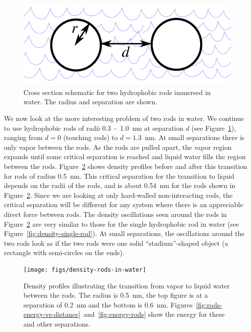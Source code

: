 \documentclass[letterpaper,twocolumn,amsmath,amssymb,prb]{revtex4-1}
\begin{document}
\begin{figure}
\begin{center}
\includegraphics[width=\columnwidth]{figs/rods-diagram}
\end{center}
\caption{ Cross section schematic for two hydrophobic rods immersed in water.
The radius and separation are shown.}
\label{fig:rods}
\end{figure}

We now look at the more interesting problem of two rods in water. We continue to
use hydrophobic rods of radii 0.3~-~1.0~nm at separation $d$ (see Figure~\ref{fig:rods}), ranging from $d=0$ 
(touching rods) to $d=1.3$~nm. At small
separations there is only vapor between the rods. As the rods are
pulled apart, the vapor region expands until some critical separation is
reached and liquid water fills the region between the rods. Figure~\ref{fig:density-rods} 
shows density profiles before and after this transition
for rods of radius 0.5~nm. This critical separation for the transition to liquid depends
on the radii of the rods, and is about 0.54~nm for the rods shown in 
Figure~\ref{fig:density-rods}. 
Since we are looking at only hard-walled
non-interacting rods, the critical separation will be
different for any system where there is an appreciable direct force between rods. 
The density oscillations seen around the rods in Figure~\ref{fig:density-rods} 
are very similar to
those for the single hydrophobic rod in water (see Figure~\ref{fig:density-single-rod}).
At small separations, the oscillations around the two rods look as if the two rods were one
solid ``stadium''-shaped object (a rectangle with semi-circles on the ends).

\begin{figure}
\begin{center}
\texttt{[image: figs/density-rods-in-water]}
\end{center}
\caption{ Density profiles illustrating the transition from vapor 
to liquid water between the rods. The radius is 0.5~nm, the top figure is 
at a separation of 0.2~nm and the
bottom is 0.6~nm. Figures~\ref{fig:rods-energy-vs-distance}~and~\ref{fig:energy-rods} show
the energy for these and other separations.}
\label{fig:density-rods}
\end{figure}
\end{document}
